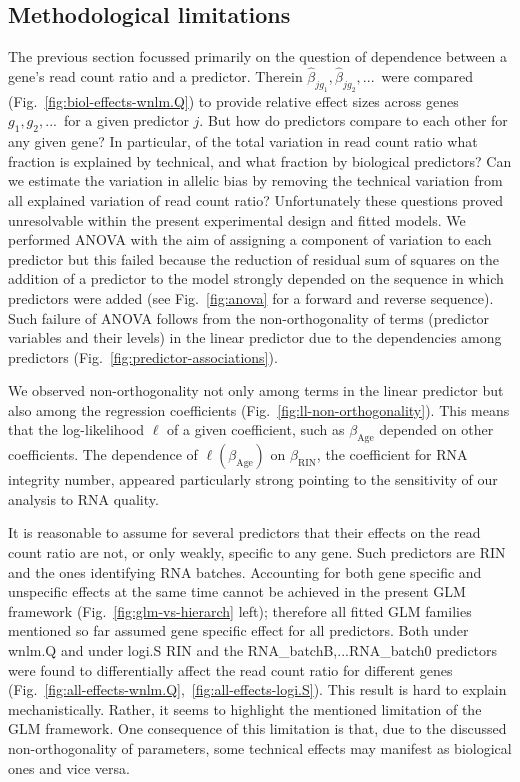 \documentclass[12pt,letterpaper]{article}
\begin{document}
\subsection{Methodological limitations}
\label{sec:limitations}

The previous section focussed primarily on the question of dependence between
a gene's read count ratio and a predictor.  Therein \(\hat\beta_{jg_1},
\hat\beta_{jg_2},...\)~were compared (Fig.~\ref{fig:biol-effects-wnlm.Q}) to
provide relative effect sizes across genes \(g_1, g_2,...\)~for a given
predictor \(j\). But how do predictors compare to each other for any given
gene? In particular, of the total variation in read count ratio what fraction
is explained by technical, and what fraction by biological predictors? Can we
estimate the variation in allelic bias by removing the technical variation
from all explained variation of read count ratio?  Unfortunately these
questions proved unresolvable within the present experimental design and
fitted models. We performed ANOVA with the aim of assigning a component of
variation to each predictor but this failed because the reduction of residual
sum of squares on the addition of a predictor to the model strongly depended
on the sequence in which predictors were added (see Fig.~\ref{fig:anova} for a
forward and reverse sequence). Such failure of ANOVA follows from
the non-orthogonality of terms (predictor variables and their levels) in the
linear predictor due to the dependencies among predictors
(Fig.~\ref{fig:predictor-associations}).

We observed non-orthogonality not only among terms in the linear predictor but
also among the regression coefficients (Fig.~\ref{fig:ll-non-orthogonality}).
This means that the log-likelihood \(\ell\) of a given coefficient, such as
\(\beta_\mathrm{Age}\) depended on other coefficients.  The dependence of
\(\ell(\beta_\mathrm{Age})\) on \(\beta_\mathrm{RIN}\), the coefficient for
RNA integrity number, appeared particularly strong pointing to the sensitivity
of our analysis to RNA quality.

It is reasonable to assume for several predictors that their effects on the
read count ratio are not, or only weakly, specific to any gene.  Such predictors are RIN
and the ones identifying RNA batches.  Accounting for both gene specific and
unspecific effects at the same time cannot be achieved in the present GLM
framework (Fig.~\ref{fig:glm-vs-hierarch} left); therefore all fitted GLM
families mentioned so far assumed gene specific effect for all predictors.
Both under wnlm.Q and under logi.S RIN and the RNA\_batchB,...RNA\_batch0
predictors were found to differentially affect the read count ratio for
different genes
(Fig.~\ref{fig:all-effects-wnlm.Q},~\ref{fig:all-effects-logi.S}).  This result
is hard to explain mechanistically.  Rather, it seems to highlight the
mentioned limitation of the GLM framework.  One consequence of this limitation
is that, due to the discussed non-orthogonality of parameters, some technical
effects may manifest as biological ones and vice versa.
\end{document}
